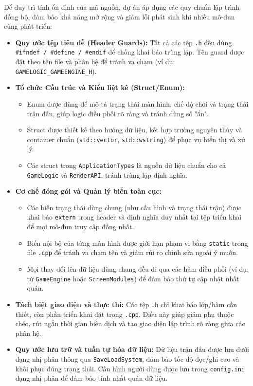 \noindent \indent Để duy trì tính ổn định của mã nguồn, dự án áp dụng các quy chuẩn lập trình đồng bộ, đảm bảo khả năng mở rộng và giảm lỗi phát sinh khi nhiều mô-đun cùng phát triển:

\begin{itemize}
    \item \textbf{Quy ước tệp tiêu đề (Header Guards):}
    Tất cả các tệp \texttt{.h} đều dùng \texttt{\#ifndef / \#define / \#endif} để chống khai báo trùng lặp. Tên guard được đặt theo tên file và phân hệ để tránh va chạm (ví dụ: \texttt{GAMELOGIC\_GAMEENGINE\_H}).

    \item \textbf{Tổ chức Cấu trúc và Kiểu liệt kê (Struct/Enum):}
    \begin{itemize}
        \item Enum được dùng để mô tả trạng thái màn hình, chế độ chơi và trạng thái trận đấu, giúp logic điều phối rõ ràng và tránh dùng số "ẩn".
        \item Struct được thiết kế theo hướng dữ liệu, kết hợp trường nguyên thủy và container chuẩn (\texttt{std::vector}, \texttt{std::wstring}) để phục vụ hiển thị và xử lý.
        \item Các struct trong \texttt{ApplicationTypes} là nguồn dữ liệu chuẩn cho cả \texttt{GameLogic} và \texttt{RenderAPI}, tránh trùng lặp định nghĩa.
    \end{itemize}

    \item \textbf{Cơ chế đóng gói và Quản lý biến toàn cục:}
    \begin{itemize}
        \item Các biến trạng thái dùng chung (như cấu hình và trạng thái trận) được khai báo \texttt{extern} trong header và định nghĩa duy nhất tại tệp triển khai để mọi mô-đun truy cập đồng nhất.
        \item Biến nội bộ của từng màn hình được giới hạn phạm vi bằng \texttt{static} trong file \texttt{.cpp} để tránh va chạm tên và giảm rủi ro chỉnh sửa ngoài ý muốn.
        \item Mọi thay đổi lên dữ liệu dùng chung đều đi qua các hàm điều phối (ví dụ: từ \texttt{GameEngine} hoặc \texttt{ScreenModules}) để đảm bảo thứ tự cập nhật nhất quán.
    \end{itemize}

    \item \textbf{Tách biệt giao diện và thực thi:}
    Các tệp \texttt{.h} chỉ khai báo lớp/hàm cần thiết, còn phần triển khai đặt trong \texttt{.cpp}. Điều này giúp giảm phụ thuộc chéo, rút ngắn thời gian biên dịch và tạo giao diện lập trình rõ ràng giữa các phân hệ.

    \item \textbf{Quy ước lưu trữ và tuần tự hóa dữ liệu:}
    Dữ liệu trận đấu được lưu dưới dạng nhị phân thông qua \texttt{SaveLoadSystem}, đảm bảo tốc độ đọc/ghi cao và khôi phục đúng trạng thái. Cấu hình người dùng được lưu trong \texttt{config.ini} dạng nhị phân để đảm bảo tính nhất quán dữ liệu.
\end{itemize}
